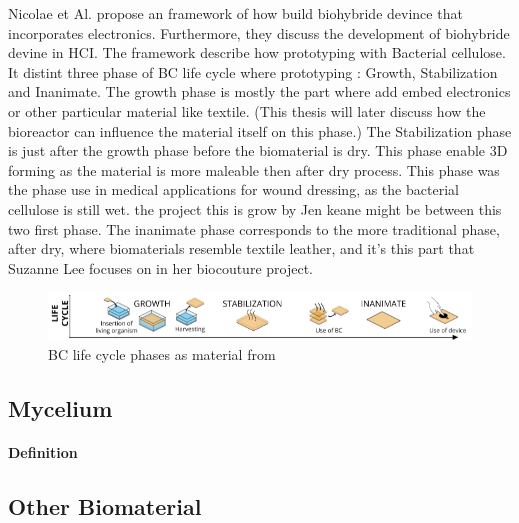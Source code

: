Nicolae et Al. propose an framework \cite{nicolae2023biohybrid} of how build biohybride devince that incorporates electronics. 
Furthermore, they discuss the development of biohybride devine in HCI. The framework describe how prototyping with Bacterial cellulose. It distint three phase of BC life cycle where prototyping : Growth, Stabilization and Inanimate. 
The growth phase is mostly the part where add embed electronics or other particular material like textile. (This thesis will later discuss how the bioreactor can influence the material itself on this phase.)
The Stabilization phase is just after the growth phase before the biomaterial is dry. This phase enable 3D forming as the material is more maleable then after dry process. This phase was the phase use in medical applications for wound dressing, as the bacterial cellulose is still wet. the project this is grow by Jen keane might be between this two first phase.
The inanimate phase corresponds to the more traditional phase, after dry, where biomaterials resemble textile leather, and it's this part that Suzanne Lee focuses on in her biocouture project. 

\begin{figure}[h]
    \centering
    \includegraphics[width=1.4\textwidth]{images/phase-proto.png}
    \caption{BC life cycle phases as material from\cite{nicolae2023biohybrid}}
    \label{fig:life cycle}
\end{figure}




\subsection{Mycelium}


\paragraph[short]{Definition}



\subsection{Other Biomaterial}




















